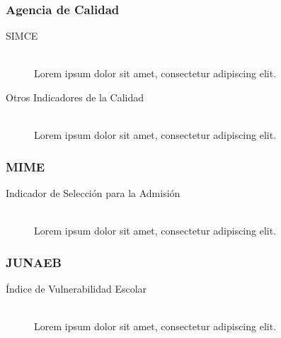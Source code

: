\subsubsection{Agencia de Calidad}
\begin{description}

  \item[SIMCE] \hfill \\
    Lorem ipsum dolor sit amet, consectetur adipiscing elit. 
  
  \item[Otros Indicadores de la Calidad] \hfill \\
     Lorem ipsum dolor sit amet, consectetur adipiscing elit. 
  
\end{description}

\subsubsection{MIME}
\begin{description}
  \item[Indicador de Selección para la Admisión] \hfill \\
     Lorem ipsum dolor sit amet, consectetur adipiscing elit.
\end{description}
\subsubsection{JUNAEB}
\begin{description}
  \item[Índice de Vulnerabilidad Escolar] \hfill \\
     Lorem ipsum dolor sit amet, consectetur adipiscing elit.
\end{description}
